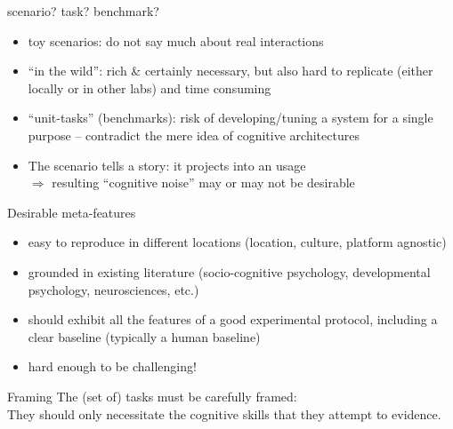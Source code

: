 \documentclass[compress]{beamer}
\begin{document}
\begin{frame}{}

    {\Medium scenario? task? benchmark?}

    \begin{itemize}
        \item<2-> {\Medium toy scenarios}: do not say much about real interactions
        \item<3-> {\Medium ``in the wild''}: rich \& certainly necessary, but also hard to replicate (either
            locally or in other labs) and time consuming
        \item<4-> {\Medium ``unit-tasks''} (benchmarks): risk of developing/tuning a system for
            a single purpose -- contradict the mere idea of cognitive architectures
        \item<5-> The scenario {\Medium tells a story}: it projects into an
            usage\\ $\Rightarrow$ resulting ``cognitive noise'' may or may not be desirable
    \end{itemize}
\end{frame}


\begin{frame}{Desirable meta-features}

    \begin{itemize}
        \item easy to reproduce in different locations (location, culture,
            platform agnostic)
        \item grounded in existing literature (socio-cognitive psychology, developmental
            psychology, neurosciences, etc.)
        \item should exhibit all the features of a good experimental protocol,
            including a clear baseline (typically a human baseline)
        \item hard enough to be challenging!
    \end{itemize}
\end{frame}

\begin{frame}{Framing}
    The (set of) tasks must be {\Medium carefully framed}:\\

    They should {\Medium only necessitate the cognitive skills that they
    attempt to evidence}.

\end{frame}
\end{document}

